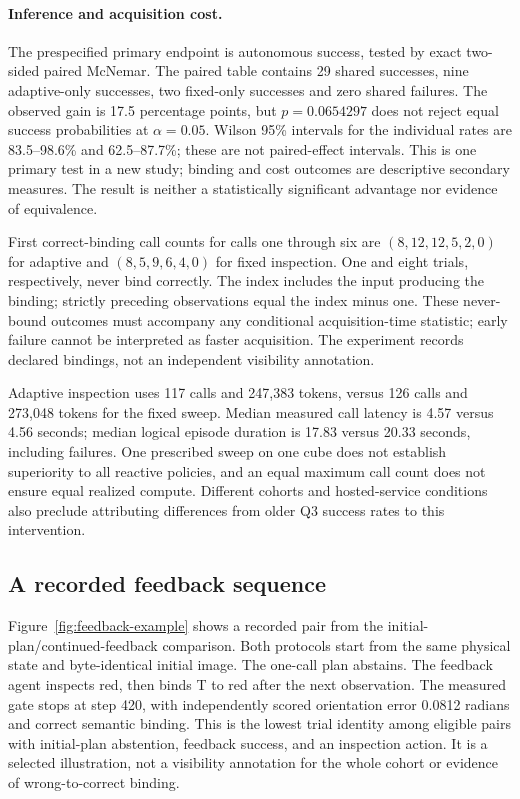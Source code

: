 \paragraph{Inference and acquisition cost.}
The prespecified primary endpoint is autonomous success, tested by exact two-sided paired McNemar. The paired table contains 29 shared successes, nine adaptive-only successes, two fixed-only successes and zero shared failures. The observed gain is 17.5 percentage points, but $p=0.0654297$ does not reject equal success probabilities at $\alpha=0.05$. Wilson 95\% intervals for the individual rates are 83.5--98.6\% and 62.5--87.7\%; these are not paired-effect intervals. This is one primary test in a new study; binding and cost outcomes are descriptive secondary measures. The result is neither a statistically significant advantage nor evidence of equivalence.

First correct-binding call counts for calls one through six are $(8,12,12,5,2,0)$ for adaptive and $(8,5,9,6,4,0)$ for fixed inspection. One and eight trials, respectively, never bind correctly. The index includes the input producing the binding; strictly preceding observations equal the index minus one. These never-bound outcomes must accompany any conditional acquisition-time statistic; early failure cannot be interpreted as faster acquisition. The experiment records declared bindings, not an independent visibility annotation.

Adaptive inspection uses 117 calls and 247,383 tokens, versus 126 calls and 273,048 tokens for the fixed sweep. Median measured call latency is 4.57 versus 4.56 seconds; median logical episode duration is 17.83 versus 20.33 seconds, including failures. One prescribed sweep on one cube does not establish superiority to all reactive policies, and an equal maximum call count does not ensure equal realized compute. Different cohorts and hosted-service conditions also preclude attributing differences from older Q3 success rates to this intervention.



\subsection{A recorded feedback sequence}
Figure~\ref{fig:feedback-example} shows a recorded pair from the initial-plan/continued-feedback comparison. Both protocols start from the same physical state and byte-identical initial image. The one-call plan abstains. The feedback agent inspects red, then binds T to red after the next observation. The measured gate stops at step 420, with independently scored orientation error 0.0812 radians and correct semantic binding. This is the lowest trial identity among eligible pairs with initial-plan abstention, feedback success, and an inspection action. It is a selected illustration, not a visibility annotation for the whole cohort or evidence of wrong-to-correct binding.

